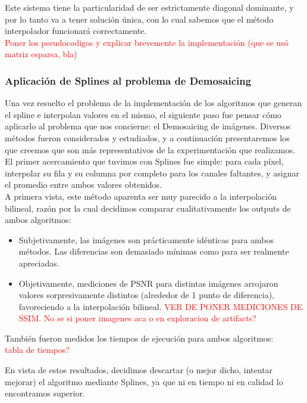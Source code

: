 \documentclass[a4paper]{article}
\begin{document}
Este sistema tiene la particularidad de ser estrictamente diagonal dominante, y por lo tanto va a tener solución única, con lo cual sabemos que el método interpolador funcionará correctamente. \\


\textcolor{red}{Poner los pseudocodigos y explicar brevemente la implementación (que se usó matriz esparsa, bla)\\}


\subsubsection*{Aplicación de Splines al problema de Demosaicing}

Una vez resuelto el problema de la implementación de los algoritmos que generan el spline e interpolan valores en el mismo, el siguiente paso fue pensar c\'omo aplicarlo al problema que nos concierne: el Demosaicing de imágenes. Diversos métodos fueron considerados y estudiados, y a continuación presentaremos los que creemos que son más representativos de la experimentación que realizamos. \\

El primer acercamiento que tuvimos con Splines fue simple: para cada p\'ixel, interpolar su fila y su columna por completo para los canales faltantes, y asignar el promedio entre ambos valores obtenidos. \\
A primera vista, este método aparenta ser muy parecido a la interpolación bilineal, razón por la cual decidimos comparar cualitativamente los outputs de ambos algoritmos:
\begin{itemize}
\item Subjetivamente, las imágenes son prácticamente idénticas para ambos métodos. Las diferencias son demasiado mínimas como para ser realmente apreciadas.
\item Objetivamente, mediciones de PSNR para distintas imágenes arrojaron valores sorpresivamente distintos (alrededor de 1 punto de diferencia), favoreciendo a la interpolación bilineal. \textcolor{red}{VER DE PONER MEDICIONES DE SSIM. No se si poner imagenes aca o en exploracion de artifacts?}
\end{itemize}

También fueron medidos los tiempos de ejecución para ambos algoritmos:\\

\textcolor{red}{tabla de tiempos?\\}

En vista de estos resultados, decidimos descartar (o mejor dicho, intentar mejorar) el algoritmo mediante Splines, ya que ni en tiempo ni en calidad lo encontramos superior.\\
\end{document}
